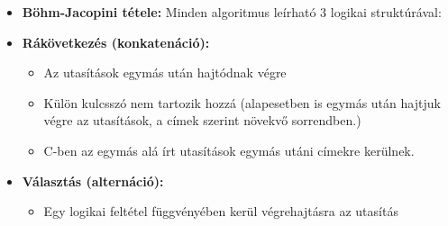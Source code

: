 \documentclass[11pt,a4paper]{article}
\begin{document}
            \begin{tcolorbox}[colback=blue!5!white,colframe=blue!50!black,title= 15. Ismertesse az alapvető algoritmus-elemeket a Böhm-Jacopini tétel alapján!]
                \begin{itemize}
                    \item \textbf{Böhm-Jacopini tétele:} Minden algoritmus leírható 3 logikai struktúrával:
                    \item \textbf{Rákövetkezés (konkatenáció):}
                    \begin{itemize}
                        \item Az utasítások egymás után hajtódnak végre
                        \item Külön kulcsszó nem tartozik hozzá (alapesetben is egymás után hajtjuk végre az utasítások, a címek szerint növekvő sorrendben.) 
                        \item C-ben az egymás alá írt utasítások egymás utáni címekre kerülnek.
                    \end{itemize}
                    \begin{center}
                    \end{center}
                    \item \textbf{Választás (alternáció):}
                    \begin{itemize}
                        \item Egy logikai feltétel függvényében kerül végrehajtásra az utasítás

\end{itemize}
\end{itemize}
\end{tcolorbox}
\end{document}
